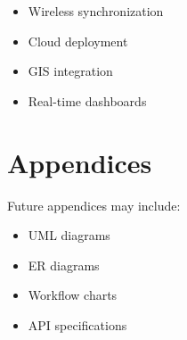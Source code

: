 \documentclass[12pt]{article}
\begin{document}
\begin{itemize}
\item Wireless synchronization
\item Cloud deployment
\item GIS integration
\item Real-time dashboards
\end{itemize}

\section{Appendices}

Future appendices may include:

\begin{itemize}
\item UML diagrams
\item ER diagrams
\item Workflow charts
\item API specifications
\end{itemize}
\end{document}
